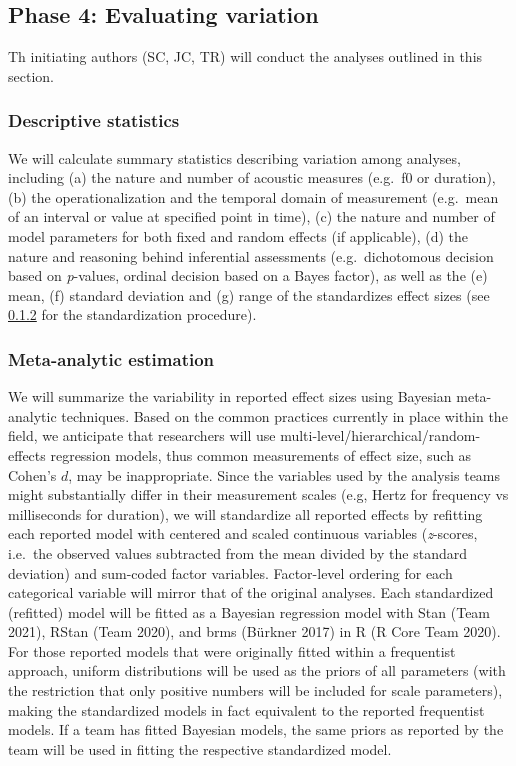 \documentclass[
  12pt,
]{article}
\begin{document}
\hypertarget{phase-4-evaluating-variation}{%
\subsection{Phase 4: Evaluating variation}\label{phase-4-evaluating-variation}}

Th initiating authors (SC, JC, TR) will conduct the analyses outlined in this section.

\hypertarget{descriptive-statistics}{%
\subsubsection{Descriptive statistics}\label{descriptive-statistics}}

We will calculate summary statistics describing variation among analyses, including (a) the nature and number of acoustic measures (e.g.~f0 or duration), (b) the operationalization and the temporal domain of measurement (e.g.~mean of an interval or value at specified point in time), (c) the nature and number of model parameters for both fixed and random effects (if applicable), (d) the nature and reasoning behind inferential assessments (e.g.~dichotomous decision based on \emph{p}-values, ordinal decision based on a Bayes factor), as well as the (e) mean, (f) standard deviation and (g) range of the standardizes effect sizes (see \ref{s:meta-est} for the standardization procedure).

\hypertarget{s:meta-est}{%
\subsubsection{Meta-analytic estimation}\label{s:meta-est}}

We will summarize the variability in reported effect sizes using Bayesian meta-analytic techniques.
Based on the common practices currently in place within the field, we anticipate that researchers will use multi-level/hierarchical/random-effects regression models, thus common measurements of effect size, such as Cohen's \(d\), may be inappropriate.
Since the variables used by the analysis teams might substantially differ in their measurement scales (e.g, Hertz for frequency vs milliseconds for duration), we will standardize all reported effects by refitting each reported model with centered and scaled continuous variables (\emph{z}-scores, i.e.~the observed values subtracted from the mean divided by the standard deviation) and sum-coded factor variables.
Factor-level ordering for each categorical variable will mirror that of the original analyses.
Each standardized (refitted) model will be fitted as a Bayesian regression model with Stan (Team 2021), RStan (Team 2020), and brms (Bürkner 2017) in R (R Core Team 2020).
For those reported models that were originally fitted within a frequentist approach, uniform distributions will be used as the priors of all parameters (with the restriction that only positive numbers will be included for scale parameters), making the standardized models in fact equivalent to the reported frequentist models.
If a team has fitted Bayesian models, the same priors as reported by the team will be used in fitting the respective standardized model.
\end{document}
